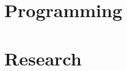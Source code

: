 \documentclass{scinote}
\begin{document}
\part{Programming}



\part{Research}



\begin{appendices}
	
\end{appendices}

\backmatter


\printbibliography[heading=bibintoc]
\printindex
\end{document}

